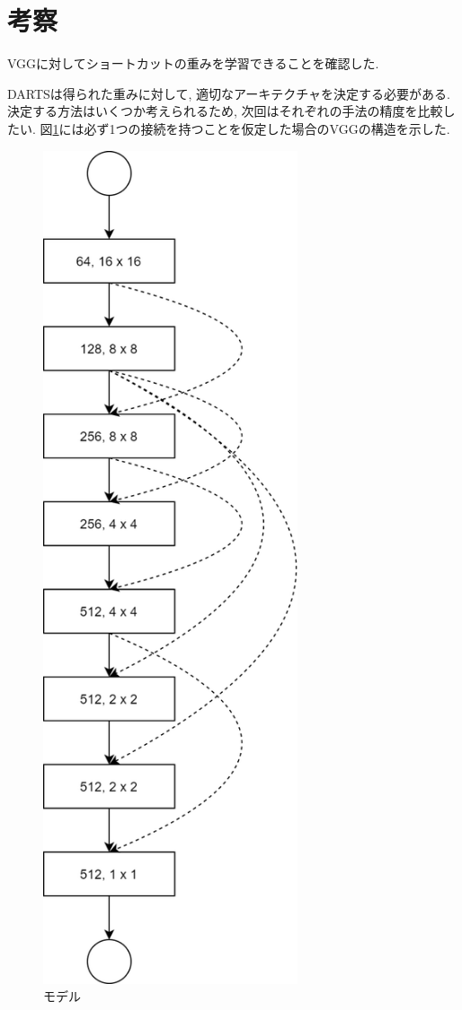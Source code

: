 \documentclass[twocolumn]{jarticle}     %
\begin{document}
\section{考察}

VGGに対してショートカットの重みを学習できることを確認した.

DARTSは得られた重みに対して, 適切なアーキテクチャを決定する必要がある.
決定する方法はいくつか考えられるため, 次回はそれぞれの手法の精度を比較したい.
図\ref{fig:result}には必ず1つの接続を持つことを仮定した場合のVGGの構造を示した.

\begin{figure}[tb]
	\begin{center}
		\includegraphics[clip,width=7.5cm]{result.png}
		\caption{モデル}
		\label{fig:result}
	\end{center}
\end{figure}
\end{document}
